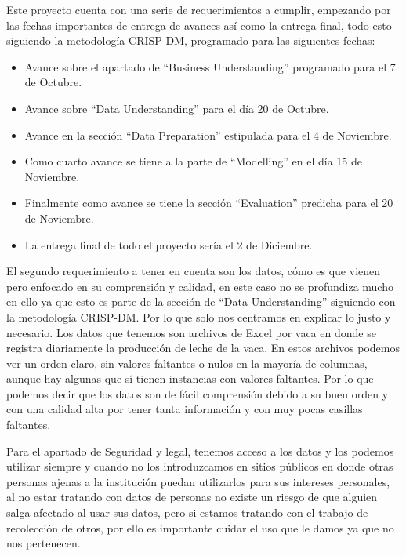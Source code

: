 \documentclass[11pt,letterpaper,DIV=12]{scrartcl}
\begin{document}


Este proyecto cuenta con una serie de requerimientos a cumplir, empezando por las fechas importantes de entrega de avances así como la entrega final, todo esto siguiendo la metodología CRISP-DM, programado para las siguientes fechas:

\begin{itemize}
  \item Avance sobre el apartado de ``Business Understanding'' programado para el 7 de Octubre.
  \item Avance sobre ``Data Understanding'' para el día 20 de Octubre.
  \item Avance en la sección ``Data Preparation'' estipulada para el 4 de Noviembre.
  \item Como cuarto avance se tiene a la parte de ``Modelling'' en el día 15 de Noviembre.
  \item Finalmente como avance se tiene la sección ``Evaluation'' predicha para el 20 de Noviembre.
  \item La entrega final de todo el proyecto sería el 2 de Diciembre.
\end{itemize}

El segundo requerimiento a tener en cuenta son los datos, cómo es que vienen pero enfocado en su comprensión y calidad, en este caso no se profundiza mucho en ello ya que esto es parte de la sección de ``Data Understanding'' siguiendo con la metodología CRISP-DM. Por lo que solo nos centramos en explicar lo justo y necesario. Los datos que tenemos son archivos de Excel por vaca en donde se registra diariamente la producción de leche de la vaca. En estos archivos podemos ver un orden claro, sin valores faltantes o nulos en la mayoría de columnas, aunque hay algunas que sí tienen instancias con valores faltantes. Por lo que podemos decir que los datos son de fácil comprensión debido a su buen orden y con una calidad alta por tener tanta información y con muy pocas casillas faltantes.

Para el apartado de Seguridad y legal, tenemos acceso a los datos y los podemos utilizar siempre y cuando no los introduzcamos en sitios públicos en donde otras personas ajenas a la institución puedan utilizarlos para sus intereses personales, al no estar tratando con datos de personas no existe un riesgo de que alguien salga afectado al usar sus datos, pero si estamos tratando con el trabajo de recolección de otros, por ello es importante cuidar el uso que le damos ya que no nos pertenecen.
\end{document}
